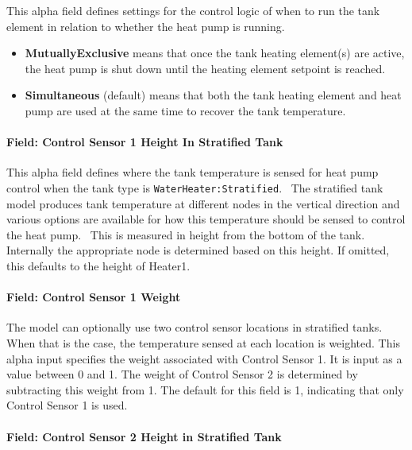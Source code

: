 This alpha field defines settings for the control logic of when to run the tank element in relation to whether the heat pump is running.

\begin{itemize}
\tightlist
\item
  \textbf{MutuallyExclusive} means that once the tank heating element(s) are active, the heat pump is shut down until the heating element setpoint is reached.
\item
  \textbf{Simultaneous} (default) means that both the tank heating element and heat pump are used at the same time to recover the tank temperature.
\end{itemize}

\paragraph{Field: Control Sensor 1 Height In Stratified Tank}\label{field-control-sensor-1-height-in-stratified-tank-1}

This alpha field defines where the tank temperature is sensed for heat pump control when the tank type is \lstinline!WaterHeater:Stratified!.~ The stratified tank model produces tank temperature at different nodes in the vertical direction and various options are available for how this temperature should be sensed to control the heat pump.~ This is measured in height from the bottom of the tank. Internally the appropriate node is determined based on this height. If omitted, this defaults to the height of Heater1.

\paragraph{Field: Control Sensor 1 Weight}\label{field-control-sensor-1-weight-1}

The model can optionally use two control sensor locations in stratified tanks. When that is the case, the temperature sensed at each location is weighted. This alpha input specifies the weight associated with Control Sensor 1. It is input as a value between 0 and 1. The weight of Control Sensor 2 is determined by subtracting this weight from 1. The default for this field is 1, indicating that only Control Sensor 1 is used.

\paragraph{Field: Control Sensor 2 Height in Stratified Tank}\label{field-control-sensor-2-height-in-stratified-tank-1}

